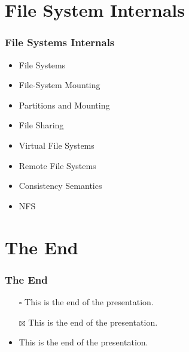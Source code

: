 \documentclass[xcolor=table, notheorems, hyperref={pdfpagelabels=false}]{beamer}
\begin{document}
\section{File System Internals}
\begin{frame}[fragile]
\frametitle{File Systems Internals}
\begin{itemize}
\item File Systems
\item File-System Mounting
\item Partitions and Mounting
\item File Sharing
\item Virtual File Systems
\item Remote File Systems
\item Consistency Semantics
\item NFS
\end{itemize}
\end{frame}




\section{The End}
\begin{frame}
\frametitle{The End}
\begin{itemize}
\item[$\square$] This is the end of the presentation.
\item[$\boxtimes$] This is the end of the presentation.
\item This is the end of the presentation.
\end{itemize}
\end{frame}

\end{document}
